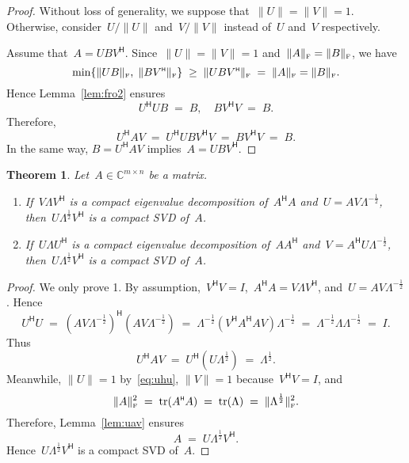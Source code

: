 \documentclass[11pt,a4paper]{article}  %
\numberwithin{equation}{section}
\newtheorem{theorem}{Theorem}%
\theoremstyle{definition}
\def\CC{\mathbb{C}}
\DeclareMathOperator{\tr}{tr}
\newcommand{\fro}{{\scriptscriptstyle{\textnormal{F}}}}
\newcommand{\hmt}{{\scriptscriptstyle{{\mathsf{H}}}}}
\begin{document}
\begin{proof}
  Without loss of generality, we suppose that~$\|U\|=\|V\|=1$. Otherwise, consider~$U/\|U\|$
  and~$V/\|V\|$ instead of~$U$ and~$V$ respectively.

  Assume that~$A = UBV^\hmt$. Since~$\|U\|=\|V\|=1$ and~$\|A\|_\fro=\|B\|_\fro$, we have
 \begin{equation*}
   \min\{\|UB\|_\fro,\; \|BV^\hmt\|_\fro\}\;\ge\;\|UBV^\hmt\|_\fro\;=\;\|A\|_\fro = \|B\|_\fro.
 \end{equation*}
 Hence Lemma~\ref{lem:fro2} ensures
 \begin{equation*}
   U^\hmt U B \;=\; B, \quad BV^\hmt V \;=\; B.
 \end{equation*}
 Therefore,
 \begin{equation*}
   U^\hmt A V \;=\; U^\hmt U B V^\hmt V \;=\; B V^\hmt V \;=\; B.
 \end{equation*}
 In the same way, $B=U^\hmt A V$ implies~$A = UBV^\hmt$.
\end{proof}


\begin{theorem}
  \label{th:ey}
  Let~$A \in \CC^{m\times n}$ be a matrix.
  \begin{enumerate}[leftmargin=1.5em]
  \item If~$V\Lambda V^\hmt$ is a compact eigenvalue decomposition of~$A^\hmt A$ and~$U = AV\Lambda^{-\frac{1}{2}}$,
    then~$U\Lambda^\frac{1}{2} V^\hmt$ is a compact SVD of~$A$.
  \item If~$U\Lambda U^\hmt$ is a compact eigenvalue decomposition of~$AA^\hmt$ and~$V = A^\hmt U\Lambda^{-\frac{1}{2}}$,
    then~$U\Lambda^\frac{1}{2} V^\hmt$ is a compact SVD of~$A$.
  \end{enumerate}
\end{theorem}

\begin{proof}
  We only prove 1. By assumption,~$V^\hmt V=I$,~$A^\hmt A = V\Lambda V^\hmt$,
  and~$U = A V\Lambda^{-\frac{1}{2}}$. Hence
  \begin{equation}
    \label{eq:uhu}
    U^\hmt U \;=\;  (A V\Lambda^{-\frac{1}{2}})^\hmt  (AV\Lambda^{-\frac{1}{2}})
    \;=\; \Lambda^{-\frac{1}{2}}(V^\hmt A^\hmt A V)\Lambda^{-\frac{1}{2}}
    \;=\; \Lambda^{-\frac{1}{2}}\Lambda\Lambda^{-\frac{1}{2}} \;=\; I.
  \end{equation}
  Thus
  \begin{equation*}
    U^\hmt A V \;=\; U^\hmt (U\Lambda^{\frac{1}{2}}) \;=\; \Lambda^{\frac{1}{2}}.
  \end{equation*}
  Meanwhile, $\|U\|=1$ by~\eqref{eq:uhu}, $\|V\|=1$ because~$V^\hmt V = I$, and
  \begin{equation*}
    \|A\|_\fro^2 \;=\; \tr(A^\hmt A) \;=\; \tr(\Lambda) \;=\; \|\Lambda^{\frac{1}{2}}\|_\fro^2.
  \end{equation*}
  Therefore, Lemma~\ref{lem:uav} ensures
  \begin{equation}
    \nonumber
    A \;=\; U\Lambda^{\frac{1}{2}}V^\hmt.
  \end{equation}
  Hence~$U\Lambda^{\frac{1}{2}}V^\hmt$ is a compact SVD of~$A$.
\end{proof}
\end{document}

